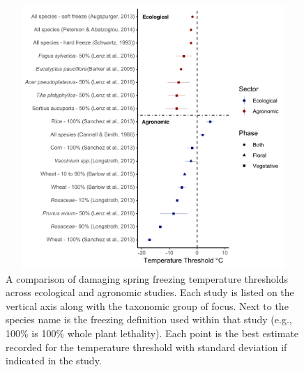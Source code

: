 \documentclass{article}\usepackage[]{graphicx}\usepackage[]{color}
\begin{document}
\begin{figure} [H] 
 \begin{center}
 \includegraphics[width=12cm, height=10cm]{..//figures/temperaturethreshold_color.pdf} 
 \caption{A comparison of damaging spring freezing temperature thresholds across ecological and agronomic studies. Each study is listed on the vertical axis along with the taxonomic group of focus. Next to the species name is the freezing definition used within that study (e.g., 100\% is 100\% whole plant lethality). Each point is the best estimate recorded for the temperature threshold with standard deviation if indicated in the study.}\label{fig:temp} 
 \end{center}
 \end{figure}
\end{document}
